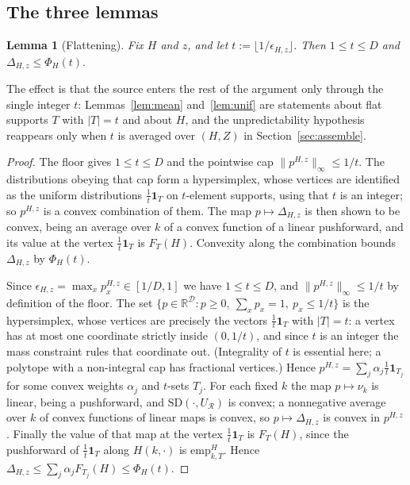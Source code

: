\documentclass[11pt,a4paper]{article}
\theoremstyle{plain}
\newtheorem{lemma}{Lemma}
\theoremstyle{definition}
\theoremstyle{remark}
\newcommand{\SD}{\mathrm{SD}}
\newcommand{\calD}{\mathcal{D}}
\newcommand{\calR}{\mathcal{R}}
\newcommand{\emp}{\mathrm{emp}}
\begin{document}
\subsection{The three lemmas}\label{sec:lemmas}

\begin{lemma}[Flattening]\label{lem:flat}
Fix $H$ and $z$, and let $t := \lfloor 1/\epsilon_{H,z} \rfloor$. Then $1 \le t \le D$ and
\(
  \Delta_{H,z} \le \Phi_{H}(t).
\)
\end{lemma}

The effect is that the source enters the rest of the argument only through the single integer $t$:
Lemmas~\ref{lem:mean} and~\ref{lem:unif} are statements about flat supports $T$ with $|T| = t$ and
about $H$, and the unpredictability hypothesis reappears only when $t$ is averaged over $(H,Z)$ in
Section~\ref{sec:assemble}.

\begin{proof}
The floor gives $1 \le t \le D$ and the pointwise cap $\|p^{H,z}\|_{\infty} \le 1/t$. The
distributions obeying that cap form a hypersimplex, whose vertices are identified as the uniform
distributions $\tfrac1t\mathbf{1}_{T}$ on $t$-element supports, using that $t$ is an integer; so
$p^{H,z}$ is a convex combination of them. The map $p \mapsto \Delta_{H,z}$ is then shown to be
convex, being an average over $k$ of a convex function of a linear pushforward, and its value at
the vertex $\tfrac1t\mathbf{1}_{T}$ is $F_{T}(H)$. Convexity along the combination bounds
$\Delta_{H,z}$ by $\Phi_{H}(t)$.

Since $\epsilon_{H,z} = \max_x p^{H,z}_x \in [1/D, 1]$ we have $1 \le t \le D$, and $\|p^{H,z}\|_\infty
\le 1/t$ by definition of the floor. The set $\{p \in \mathbb{R}^{\calD} : p \ge 0,\ \sum_x p_x = 1,\
p_x \le 1/t\}$ is the hypersimplex, whose vertices are precisely the vectors $\tfrac{1}{t}\mathbf{1}_T$
with $|T| = t$: a vertex has at most one coordinate strictly inside $(0, 1/t)$, and since $t$ is an
integer the mass constraint rules that coordinate out. (Integrality of $t$ is essential here; a
polytope with a non-integral cap has fractional vertices.) Hence $p^{H,z} = \sum_j \alpha_j
\tfrac{1}{t}\mathbf{1}_{T_j}$ for some convex weights $\alpha_j$ and $t$-sets $T_j$. For each fixed
$k$ the map $p \mapsto \nu_{k}$ is linear, being a pushforward, and $\SD(\cdot,U_{\calR})$ is convex;
a nonnegative average over $k$ of convex functions of linear maps is convex, so $p \mapsto
\Delta_{H,z}$ is convex in $p^{H,z}$. Finally the value of that map at the vertex
$\tfrac1t\mathbf{1}_{T}$ is $F_{T}(H)$, since the pushforward of $\tfrac1t\mathbf{1}_{T}$ along
$H(k,\cdot)$ is $\emp^{H}_{k,T}$. Hence
$\Delta_{H,z} \le \sum_j \alpha_j F_{T_j}(H) \le \Phi_H(t)$.
\end{proof}
\end{document}
